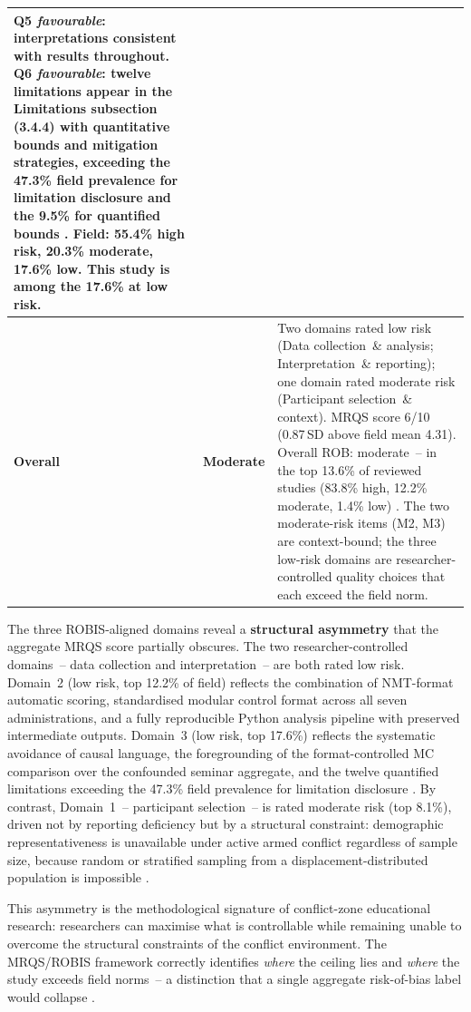 \begin{table}[!h]
\begin{tabular}{llp{9cm}}
Q5 \emph{favourable}: interpretations consistent with results throughout. Q6 \emph{favourable}: twelve limitations appear in the Limitations subsection (3.4.4) with quantitative bounds and mitigation strategies, exceeding the 47.3\% field prevalence for limitation disclosure and the 9.5\% for quantified bounds \cite{Korniienko2025mrqs}.
Field: 55.4\% high risk, 20.3\% moderate, 17.6\% low. This study is among the 17.6\% at low risk. \\
\hline
\textbf{Overall} & \textbf{Moderate} &
Two domains rated low risk (Data collection~\& analysis; Interpretation~\& reporting); one domain rated moderate risk (Participant selection~\& context). MRQS score 6/10 (0.87\,SD above field mean 4.31). Overall ROB: moderate~-- in the top 13.6\% of reviewed studies (83.8\% high, 12.2\% moderate, 1.4\% low) \cite{Korniienko2025mrqs}. The two moderate-risk items (M2, M3) are context-bound; the three low-risk domains are researcher-controlled quality choices that each exceed the field norm. \\
\hline
\end{tabular}
\end{table}

The three ROBIS-aligned domains reveal a \textbf{structural asymmetry} that the aggregate MRQS score partially obscures. The two researcher-controlled domains~-- data collection and interpretation~-- are both rated low risk. Domain~2 (low risk, top 12.2\% of field) reflects the combination of NMT-format automatic scoring, standardised modular control format across all seven administrations, and a fully reproducible Python analysis pipeline with preserved intermediate outputs. Domain~3 (low risk, top 17.6\%) reflects the systematic avoidance of causal language, the foregrounding of the format-controlled MC comparison over the confounded seminar aggregate, and the twelve quantified limitations exceeding the 47.3\% field prevalence for limitation disclosure \cite{Korniienko2025mrqs}. By contrast, Domain~1~-- participant selection~-- is rated moderate risk (top 8.1\%), driven not by reporting deficiency but by a structural constraint: demographic representativeness is unavailable under active armed conflict regardless of sample size, because random or stratified sampling from a displacement-distributed population is impossible \cite{Burde2017}.

This asymmetry is the methodological signature of conflict-zone educational research: researchers can maximise what is controllable while remaining unable to overcome the structural constraints of the conflict environment. The MRQS/ROBIS framework correctly identifies \emph{where} the ceiling lies and \emph{where} the study exceeds field norms~-- a distinction that a single aggregate risk-of-bias label would collapse \cite{HigginsThomas2019, Whiting2016}.

